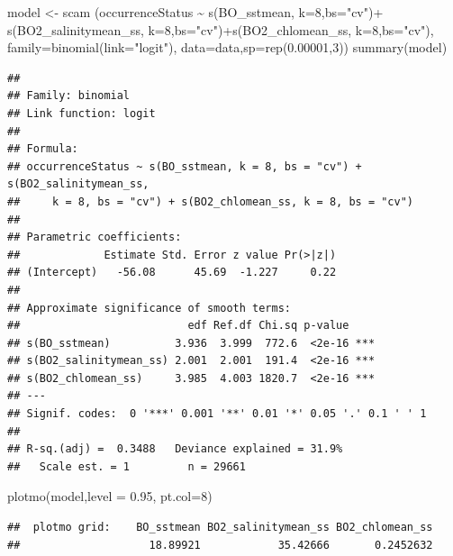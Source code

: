 \documentclass[
]{book}
\newenvironment{Shaded}{\begin{snugshade}}{\end{snugshade}}
\newcommand{\AttributeTok}[1]{\textcolor[rgb]{0.77,0.63,0.00}{#1}}
\newcommand{\DecValTok}[1]{\textcolor[rgb]{0.00,0.00,0.81}{#1}}
\newcommand{\FloatTok}[1]{\textcolor[rgb]{0.00,0.00,0.81}{#1}}
\newcommand{\FunctionTok}[1]{\textcolor[rgb]{0.00,0.00,0.00}{#1}}
\newcommand{\NormalTok}[1]{#1}
\newcommand{\OtherTok}[1]{\textcolor[rgb]{0.56,0.35,0.01}{#1}}
\newcommand{\SpecialCharTok}[1]{\textcolor[rgb]{0.00,0.00,0.00}{#1}}
\newcommand{\StringTok}[1]{\textcolor[rgb]{0.31,0.60,0.02}{#1}}
\begin{document}
\begin{Shaded}
\begin{Highlighting}[]
\NormalTok{model }\OtherTok{\textless{}{-}} \FunctionTok{scam}\NormalTok{ (occurrenceStatus }\SpecialCharTok{\textasciitilde{}}  \FunctionTok{s}\NormalTok{(BO\_sstmean, }\AttributeTok{k=}\DecValTok{8}\NormalTok{,}\AttributeTok{bs=}\StringTok{"cv"}\NormalTok{)}\SpecialCharTok{+} \FunctionTok{s}\NormalTok{(BO2\_salinitymean\_ss, }\AttributeTok{k=}\DecValTok{8}\NormalTok{,}\AttributeTok{bs=}\StringTok{"cv"}\NormalTok{)}\SpecialCharTok{+}\FunctionTok{s}\NormalTok{(BO2\_chlomean\_ss, }\AttributeTok{k=}\DecValTok{8}\NormalTok{,}\AttributeTok{bs=}\StringTok{"cv"}\NormalTok{), }\AttributeTok{family=}\FunctionTok{binomial}\NormalTok{(}\AttributeTok{link=}\StringTok{"logit"}\NormalTok{), }\AttributeTok{data=}\NormalTok{data,}\AttributeTok{sp=}\FunctionTok{rep}\NormalTok{(}\FloatTok{0.00001}\NormalTok{,}\DecValTok{3}\NormalTok{))}
\FunctionTok{summary}\NormalTok{(model)}
\end{Highlighting}
\end{Shaded}

\begin{verbatim}
## 
## Family: binomial 
## Link function: logit 
## 
## Formula:
## occurrenceStatus ~ s(BO_sstmean, k = 8, bs = "cv") + s(BO2_salinitymean_ss, 
##     k = 8, bs = "cv") + s(BO2_chlomean_ss, k = 8, bs = "cv")
## 
## Parametric coefficients:
##             Estimate Std. Error z value Pr(>|z|)
## (Intercept)   -56.08      45.69  -1.227     0.22
## 
## Approximate significance of smooth terms:
##                          edf Ref.df Chi.sq p-value    
## s(BO_sstmean)          3.936  3.999  772.6  <2e-16 ***
## s(BO2_salinitymean_ss) 2.001  2.001  191.4  <2e-16 ***
## s(BO2_chlomean_ss)     3.985  4.003 1820.7  <2e-16 ***
## ---
## Signif. codes:  0 '***' 0.001 '**' 0.01 '*' 0.05 '.' 0.1 ' ' 1
## 
## R-sq.(adj) =  0.3488   Deviance explained = 31.9%
##   Scale est. = 1         n = 29661
\end{verbatim}

\begin{Shaded}
\begin{Highlighting}[]
\FunctionTok{plotmo}\NormalTok{(model,}\AttributeTok{level =} \FloatTok{0.95}\NormalTok{, }\AttributeTok{pt.col=}\DecValTok{8}\NormalTok{)}
\end{Highlighting}
\end{Shaded}

\begin{verbatim}
##  plotmo grid:    BO_sstmean BO2_salinitymean_ss BO2_chlomean_ss
##                    18.89921            35.42666       0.2452632
\end{verbatim}
\end{document}

